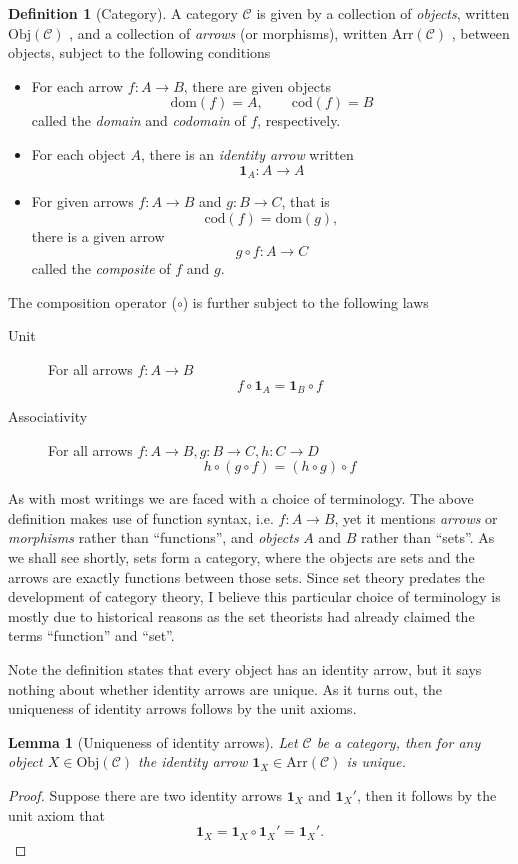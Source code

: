 \documentclass[10pt,twoside,a4paper]{article}
\newcounter{theorem}
\theoremstyle{plain}
\newtheorem{lemma}[thm]{Lemma}
\theoremstyle{definition}
\newtheorem{definition}[thm]{Definition}
\newcommand{\Domain}[1]{%
  \mathrm{dom}(#1)%
}
\newcommand{\Codomain}[1]{%
  \mathrm{cod}(#1)%
}
\newcommand{\Id}[1]{%
  \ensuremath{\mathbf{1}_{#1}}%
}
\newcommand{\Obj}[1]{%
  \ensuremath{\mathrm{Obj}(#1)}%
}
\newcommand{\Arr}[1]{%
  \ensuremath{\mathrm{Arr}(#1)}%
}
\begin{document}
\begin{definition}[Category]
\label{def:cat}
A category $\mathcal{C}$ is given by a collection of \emph{objects},
written \Obj{\mathcal{C}}, and a collection of \emph{arrows} (or
morphisms), written \Arr{\mathcal{C}}, between objects, subject to the
following conditions
\begin{itemize}
  \item For each arrow $f : A \to B$, there are given objects
\[
  \Domain{f} = A, \qquad \Codomain{f} = B
\]
called the \emph{domain} and \emph{codomain} of $f$, respectively.

  \item For each object $A$, there is an \emph{identity arrow} written
\[
  \Id{A} : A \to A
\]

  \item For given arrows $f : A \to B$ and $g : B \to C$, that is
\[
  \Codomain{f} = \Domain{g},
\]
  there is a given arrow
\[
  g \circ f : A \to C
\]
called the \emph{composite} of $f$ and $g$.
\end{itemize}
The composition operator ($\circ$) is further subject to the following
laws
\begin{description}
  \item[Unit] For all arrows $f : A \to B$
\[
  f \circ \Id{A} = \Id{B} \circ f
\]

  \item[Associativity] For all arrows $f : A \to B, g : B \to C, h : C \to D$
\[
  h \circ (g \circ f) = (h \circ g) \circ f
\]
\end{description}
\end{definition}

As with most writings we are faced with a choice of terminology. The
above definition makes use of function syntax, i.e.  $f : A \to B$,
yet it mentions \emph{arrows} or \emph{morphisms} rather than
``functions'', and \emph{objects} $A$ and $B$ rather than ``sets''. As
we shall see shortly, sets form a category, where the objects are sets
and the arrows are exactly functions between those sets. Since set
theory predates the development of category theory, I believe this
particular choice of terminology is mostly due to historical reasons
as the set theorists had already claimed the terms ``function'' and
``set''.

Note the definition states that every object has an identity arrow,
but it says nothing about whether identity arrows are unique. As it
turns out, the uniqueness of identity arrows follows by the unit
axioms.
%
\begin{lemma}[Uniqueness of identity arrows]
  Let $\mathcal{C}$ be a category, then for any object
  $X \in \Obj{\mathcal{C}}$ the identity arrow
  $\Id{X} \in \Arr{\mathcal{C}}$ is unique.
\end{lemma}
\begin{proof}
  Suppose there are two identity arrows $\Id{X}$ and $\Id{X}'$, then
  it follows by the unit axiom that
\[
  \Id{X} = \Id{X} \circ \Id{X}' = \Id{X}'.
\]
\end{proof}
\end{document}

